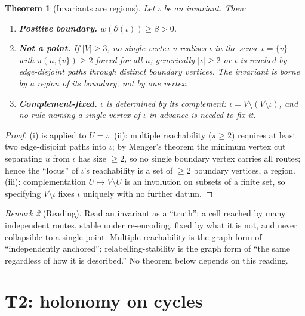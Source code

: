 \documentclass[11pt,a4paper]{article}
\theoremstyle{thmstyle}
\newtheorem{theorem}{Theorem}[section]
\theoremstyle{definition}
\theoremstyle{remark}
\newtheorem{remark}[theorem]{Remark}
\newcommand{\V}{V}
\newcommand{\wt}{w}
\newcommand{\floorc}{\beta}
\newcommand{\cut}{\partial}
\newcommand{\Inv}{\iota}            %
\newcommand{\abs}[1]{\lvert#1\rvert}
\begin{document}
\begin{theorem}[Invariants are regions]
\label{thm:region}
Let $\Inv$ be an invariant. Then:
\begin{enumerate}[label=\textup{(\roman*)},leftmargin=2.2em]
\item \textbf{Positive boundary.} $\wt(\cut(\Inv))\ge\floorc>0$.
\item \textbf{Not a point.} If $\abs{\V}\ge3$, no single vertex $v$ realises
$\Inv$ in the sense $\Inv=\{v\}$ with $\pi(u,\{v\})\ge2$ forced for all $u$;
generically $\abs{\Inv}\ge2$ or $\Inv$ is reached by edge-disjoint paths
through distinct boundary vertices. The invariant is borne by a region of
its boundary, not by one vertex.
\item \textbf{Complement-fixed.} $\Inv$ is determined by its complement:
$\Inv=\V\setminus(\V\setminus\Inv)$, and no rule naming a single vertex of
$\Inv$ in advance is needed to fix it.
\end{enumerate}
\end{theorem}

\begin{proof}
(i) is  applied to $U=\Inv$. (ii): multiple reachability
($\pi\ge2$) requires at least two edge-disjoint paths into $\Inv$; by
Menger's theorem \citep{diestel2017} the minimum vertex cut separating $u$
from $\Inv$ has size $\ge2$, so no single boundary vertex carries all routes;
hence the ``locus'' of $\Inv$'s reachability is a set of $\ge2$ boundary
vertices, a region. (iii): complementation $U\mapsto\V\setminus U$ is an
involution on subsets of a finite set, so specifying $\V\setminus\Inv$
fixes $\Inv$ uniquely with no further datum.
\end{proof}

\begin{remark}[Reading]
\label{rem:truth-read}
Read an invariant as a ``truth'': a cell reached by many independent routes,
stable under re-encoding, fixed by what it is not, and never collapsible to
a single point. Multiple-reachability is the graph form of
``independently anchored''; relabelling-stability is the graph form of
``the same regardless of how it is described.'' No theorem below depends on
this reading.
\end{remark}

\section{T2: holonomy on cycles}
\label{sec:holonomy}
\end{document}
